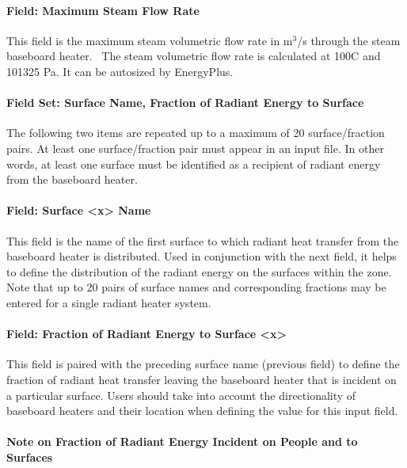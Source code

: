 \paragraph{Field: Maximum Steam Flow Rate}\label{field-maximum-steam-flow-rate-000}

This field is the maximum steam volumetric flow rate in m\(^{3}\)/s through the steam baseboard heater.~ The steam volumetric flow rate is calculated at 100C and 101325 Pa. It can be autosized by EnergyPlus.

\paragraph{Field Set: Surface Name, Fraction of Radiant Energy to Surface}\label{field-set-surface-name-fraction-of-radiant-energy-to-surface-1}

The following two items are repeated up to a maximum of 20 surface/fraction pairs. At least one surface/fraction pair must appear in an input file. In other words, at least one surface must be identified as a recipient of radiant energy from the baseboard heater.

\paragraph{Field: Surface \textless{}x\textgreater{} Name}\label{field-surface-x-name-1}

This field is the name of the first surface to which radiant heat transfer from the baseboard heater is distributed. Used in conjunction with the next field, it helps to define the distribution of the radiant energy on the surfaces within the zone. Note that up to 20 pairs of surface names and corresponding fractions may be entered for a single radiant heater system.

\paragraph{Field: Fraction of Radiant Energy to Surface \textless{}x\textgreater{}}\label{field-fraction-of-radiant-energy-to-surface-x-1}

This field is paired with the preceding surface name (previous field) to define the fraction of radiant heat transfer leaving the baseboard heater that is incident on a particular surface. Users should take into account the directionality of baseboard heaters and their location when defining the value for this input field.

\paragraph{Note on Fraction of Radiant Energy Incident on People and to Surfaces}\label{note-on-fraction-of-radiant-energy-incident-on-people-and-to-surfaces}

